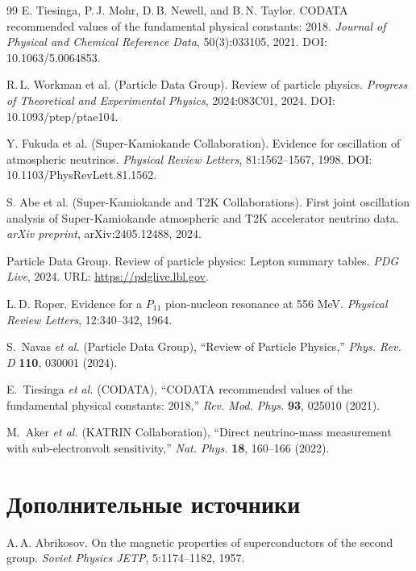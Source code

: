 \documentclass[11pt,a4paper]{article}
\begin{document}
\begin{thebibliography}{99}
	E. Tiesinga, P.\,J. Mohr, D.\,B. Newell, and B.\,N. Taylor.
	\newblock CODATA recommended values of the fundamental physical constants: 2018.
	\newblock \textit{Journal of Physical and Chemical Reference Data}, 50(3):033105, 2021.
	\newblock DOI: 10.1063/5.0064853.
	
	R.\,L. Workman et al. (Particle Data Group).
	\newblock Review of particle physics.
	\newblock \textit{Progress of Theoretical and Experimental Physics}, 2024:083C01, 2024.
	\newblock DOI: 10.1093/ptep/ptae104.
	
	Y. Fukuda et al. (Super-Kamiokande Collaboration).
	\newblock Evidence for oscillation of atmospheric neutrinos.
	\newblock \textit{Physical Review Letters}, 81:1562--1567, 1998.
	\newblock DOI: 10.1103/PhysRevLett.81.1562.
	
	S. Abe et al. (Super-Kamiokande and T2K Collaborations).
	\newblock First joint oscillation analysis of Super-Kamiokande atmospheric and T2K accelerator neutrino data.
	\newblock \textit{arXiv preprint}, arXiv:2405.12488, 2024.
	
	Particle Data Group.
	 Review of particle physics: Lepton summary tables.
	\newblock \textit{PDG Live}, 2024.
	\newblock URL: \url{https://pdglive.lbl.gov}.
	
	L.\,D. Roper.
	\newblock Evidence for a $P_{11}$ pion-nucleon resonance at 556 MeV.
	\newblock \textit{Physical Review Letters}, 12:340--342, 1964.
	
		S.~Navas \textit{et al.} (Particle Data Group), ``Review of Particle Physics,'' \textit{Phys. Rev. D} \textbf{110}, 030001 (2024).
		
		E.~Tiesinga \textit{et al.} (CODATA), ``CODATA recommended values of the fundamental physical constants: 2018,'' \textit{Rev. Mod. Phys.} \textbf{93}, 025010 (2021).
		
		M.~Aker \textit{et al.} (KATRIN Collaboration), ``Direct neutrino-mass measurement with sub-electronvolt sensitivity,'' \textit{Nat. Phys.} \textbf{18}, 160--166 (2022).
	
	\section*{Дополнительные источники}
	
	A.\,A. Abrikosov.
	\newblock On the magnetic properties of superconductors of the second group.
	\newblock \textit{Soviet Physics JETP}, 5:1174--1182, 1957.
	

\end{thebibliography}
\end{document}
